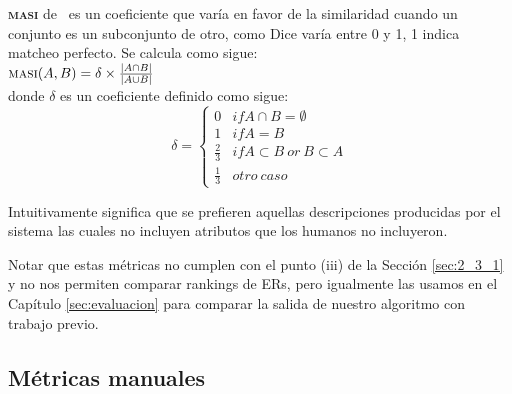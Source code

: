 \textbf{\textsc{masi}} de \cite{masi}~es un coeficiente que var\'ia en favor de la similaridad cuando un conjunto es un subconjunto de otro, como Dice var\'ia entre 0 y 1, 1 indica matcheo perfecto. Se calcula como sigue:\\

$\textsc{masi}(A,B) = \delta \times \frac{|A \cap B|}{|A \cup B|}$ \\


donde $\delta$ es un coeficiente definido como sigue:\\


 \begin{equation}
     \delta  = \left\{
	       \begin{array}{ll}
		 0      & if A \cap B = \emptyset \\
		 1 & if A = B  \\
		 \frac{2}{3}     & if A \subset B ~or~ B \subset A\\
		 \frac{1}{3}     & otro ~caso
	       \end{array}
	     \right.
 \end{equation}

Intuitivamente significa que se prefieren aquellas descripciones producidas por el sistema las cuales no incluyen atributos que los humanos no incluyeron.

Notar que estas m\'etricas no cumplen con el punto (iii) de la Secci\'on \ref{sec:2_3_1} y no nos permiten comparar rankings de ERs, pero igualmente las usamos en el Cap\'itulo \ref{sec:evaluacion} para comparar la salida de nuestro algoritmo con trabajo previo.

\subsection{M\'etricas manuales}

